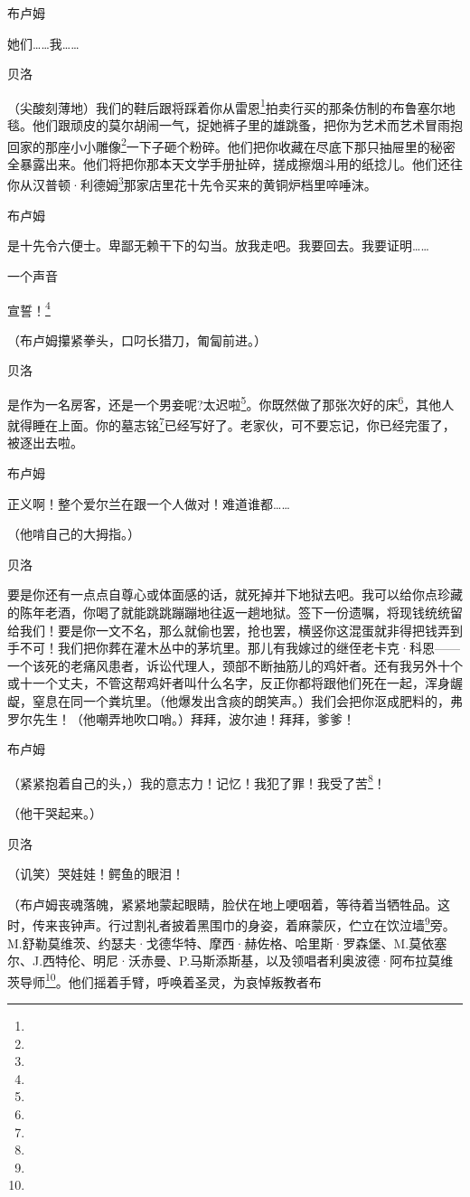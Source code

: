 \par 布卢姆
\par 她们……我……
\par 贝洛
\par （尖酸刻薄地）我们的鞋后跟将踩着你从雷恩\footnote{}拍卖行买的那条仿制的布鲁塞尔地毯。他们跟顽皮的莫尔胡闹一气，捉她裤子里的雄跳蚤，把你为艺术而艺术冒雨抱回家的那座小小雕像\footnote{}一下子砸个粉碎。他们把你收藏在尽底下那只抽屉里的秘密全暴露出来。他们将把你那本天文学手册扯碎，搓成擦烟斗用的纸捻儿。他们还往你从汉普顿·利德姆\footnote{}那家店里花十先令买来的黄铜炉档里啐唾沫。
\par 布卢姆
\par 是十先令六便士。卑鄙无赖干下的勾当。放我走吧。我要回去。我要证明……
\par 一个声音
\par 宣誓！\footnote{}
\par （布卢姆攥紧拳头，口叼长猎刀，匍匐前进。）
\par 贝洛
\par 是作为一名房客，还是一个男妾呢?太迟啦\footnote{}。你既然做了那张次好的床\footnote{}，其他人就得睡在上面。你的墓志铭\footnote{}已经写好了。老家伙，可不要忘记，你已经完蛋了，被逐出去啦。
\par 布卢姆
\par 正义啊！整个爱尔兰在跟一个人做对！难道谁都……
\par （他啃自己的大拇指。）
\par 贝洛
\par 要是你还有一点点自尊心或体面感的话，就死掉并下地狱去吧。我可以给你点珍藏的陈年老酒，你喝了就能跳跳蹦蹦地往返一趟地狱。签下一份遗嘱，将现钱统统留给我们！要是你一文不名，那么就偷也罢，抢也罢，横竖你这混蛋就非得把钱弄到手不可！我们把你葬在灌木丛中的茅坑里。那儿有我嫁过的继侄老卡克·科恩——一个该死的老痛风患者，诉讼代理人，颈部不断抽筋儿的鸡奸者。还有我另外十个或十一个丈夫，不管这帮鸡奸者叫什么名字，反正你都将跟他们死在一起，浑身龌龊，窒息在同一个粪坑里。（他爆发出含痰的朗笑声。）我们会把你沤成肥料的，弗罗尔先生！（他嘲弄地吹口哨。）拜拜，波尔迪！拜拜，爹爹！
\par 布卢姆
\par （紧紧抱着自己的头，）我的意志力！记忆！我犯了罪！我受了苦\footnote{}！
\par （他干哭起来。）
\par 贝洛
\par （讥笑）哭娃娃！鳄鱼的眼泪！
\par （布卢姆丧魂落魄，紧紧地蒙起眼睛，脸伏在地上哽咽着，等待着当牺牲品。这时，传来丧钟声。行过割礼者披着黑围巾的身姿，着麻蒙灰，伫立在饮泣墙\footnote{}旁。M.舒勒莫维茨、约瑟夫·戈德华特、摩西·赫佐格、哈里斯·罗森堡、M.莫依塞尔、J.西特伦、明尼·沃赤曼、P.马斯添斯基，以及领唱者利奥波德·阿布拉莫维茨导师\footnote{}。他们摇着手臂，呼唤着圣灵，为哀悼叛教者布
